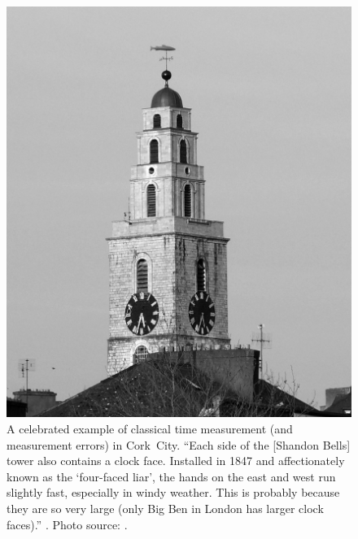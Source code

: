 \begin{savenotes}
\begin{figure}[]
  \centering
  \includegraphics[height=.5\textheight]{img/Shandon_bells_cork.BW.jpg}
  \caption[
    Classical Time. The \emph{Four Faced Liar}, Shandon Bells, Cork
  ]{
    A celebrated example of classical time measurement (and measurement errors) in Cork~City.
    ``Each side of the [Shandon Bells] tower also contains a clock face.
    Installed in 1847 and affectionately known as the
    `four-faced liar', the hands on the east and west run slightly fast, especially in windy weather.
    This is probably because they are so very large
    (only Big Ben in London has larger clock faces).''
    \parencite{CorkStrolls}. Photo source: \cite{ShandonBells}.
  }
  \label{fig:ShandonBells}
\end{figure}
\end{savenotes}